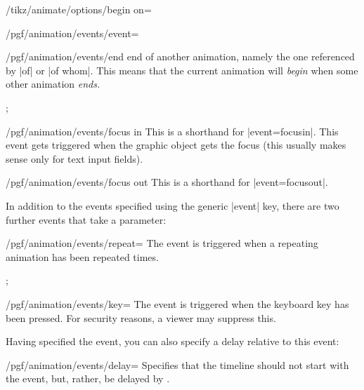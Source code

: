 \begin{key}{/tikz/animate/options/begin on=}
\begin{key}{/pgf/animation/events/event=}
\begin{key}{/pgf/animation/events/end}
      end of another animation, namely the one referenced by
      |of| or |of whom|. This means that the current animation will
      \emph{begin} when some other animation \emph{ends.}
\begin{codeexample}[width=2cm]
\tikz 
  ; 
\end{codeexample}
    \end{key}
    \begin{key}{/pgf/animation/events/focus in}
      This is a shorthand for |event=focusin|. This event gets
      triggered when the graphic object gets the focus (this usually
      makes sense only for text input fields).
    \end{key}
    \begin{key}{/pgf/animation/events/focus out}
      This is a shorthand for |event=focusout|.
    \end{key}
  \end{key}

  In addition to the events specified using the generic |event| key,
  there are two further events that take a parameter:
  \begin{key}{/pgf/animation/events/repeat=}
    The event is triggered when a repeating animation has been
    repeated  times.
\begin{codeexample}[
  animation list={
    0.333/\frac{1}{3},0.666/\frac{2}{3},1,
    1.333/1\frac{1}{3},1.666/1\frac{2}{3},2,
    2.333/2\frac{1}{3},2.666/2\frac{2}{3},3,
    3.333/2\frac{1}{3},3.666/2\frac{2}{3},4}]
\tikz 
  ; 
\end{codeexample}
  \end{key}
  
  \begin{key}{/pgf/animation/events/key=}
    The event is triggered when the keyboard key  has been
    pressed. For security reasons, a viewer may suppress this.
  \end{key}
  
  Having specified the event, you can also specify a delay relative to
  this event:

  \begin{key}{/pgf/animation/events/delay=}
    Specifies that the timeline should not start with the event, but,
    rather, be delayed by .
  \end{key}
  
\end{key}

